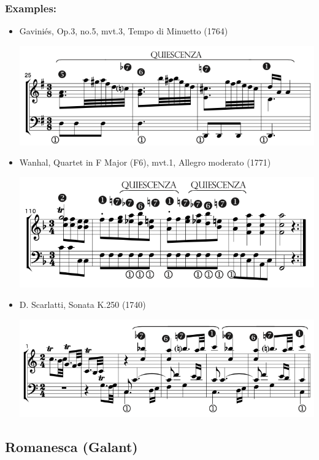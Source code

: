 \documentclass[11pt, openany]{article}
\begin{document}
\subsubsection{Examples:}
\begin{itemize}
\item Gaviniés, Op.3, no.5, mvt.3, Tempo di Minuetto (1764)
\begin{center}
\includegraphics[scale=0.5]{gavinies3.png}
\end{center}
\item Wanhal, Quartet in F Major (F6), mvt.1, Allegro moderato (1771)
\begin{center}
\includegraphics[scale=0.5]{wanhal6.png}
\end{center}
\item D. Scarlatti, Sonata K.250 (1740)
\begin{center}
\includegraphics[scale=0.5]{scarlatti250.png}
\end{center}
\end{itemize}


	\subsection{Romanesca (Galant)}
	
\end{document}
